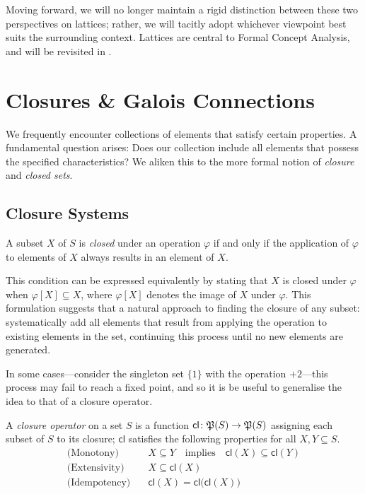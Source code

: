 Moving forward, we will no longer maintain a rigid distinction between these two perspectives on lattices; rather, we will
tacitly adopt whichever viewpoint best suits the surrounding context. Lattices are central to Formal Concept Analysis, and
will be revisited in .

\section{Closures \& Galois Connections}
\label{section:closure-systems}

We frequently encounter collections of elements that satisfy certain properties. A fundamental question arises: Does our
collection include all elements that possess the specified characteristics? We aliken this to the more formal notion of \textit{closure}
and \textit{closed sets}.

\subsection{Closure Systems}

\begin{definition}
	 \label{definition:closed-set} A subset $X$ of $S$ is \textit{closed} under an operation $\varphi$
	if and only if the application of $\varphi$ to elements of $X$ always results in an element of $X$.
\end{definition}

This condition can be expressed equivalently by stating that $X$ is closed under $\varphi$ when $\varphi [X] \subseteq X$,
where $\varphi[X]$ denotes the image of $X$ under $\varphi$. This formulation suggests that a natural approach to finding
the closure of any subset: systematically add all elements that result from applying the operation to existing elements
in the set, continuing this process until no new elements are generated.

In some cases---consider the singleton set $\{1\}$ with the operation $+2$---this process may fail to reach a fixed point,
and so it is be useful to generalise the idea to that of a closure operator.

\begin{definition}
	 \label{definition:closure-operator} A \emph{closure operator} on a set $S$ is a function
	$\mathsf{cl}\colon \mathfrak{P}({S})\to \mathfrak{P}({S})$ assigning each subset of $S$ to its closure; $\mathsf{cl}$ satisfies the following
	properties for all $X,Y \subseteq S$.
	\begin{align}
		\text{(Monotony)}\quad    & X \subseteq Y\quad \text{implies}\quad\mathsf{cl}(X) \subseteq \mathsf{cl}(Y) \\
		\text{(Extensivity)}\quad & X \subseteq \mathsf{cl}(X)                                                    \\
		\text{(Idempotency)}\quad & \mathsf{cl}(X) = \mathsf{cl}\big(\mathsf{cl}(X)\big)
	\end{align}
\end{definition}

